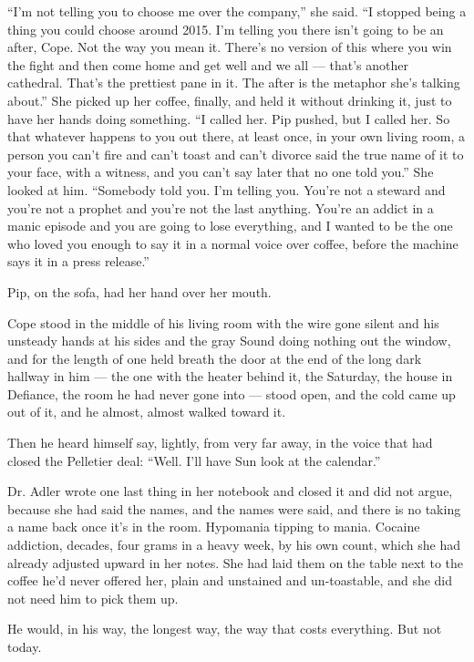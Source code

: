 \documentclass[11pt,openany]{book}
\begin{document}
``I'm not telling you to choose me over the company,'' she said. ``I stopped being a thing you could choose around 2015. I'm telling you there isn't going to be an after, Cope. Not the way you mean it. There's no version of this where you win the fight and then come home and get well and we all --- that's another cathedral. That's the prettiest pane in it. The after is the metaphor she's talking about.'' She picked up her coffee, finally, and held it without drinking it, just to have her hands doing something. ``I called her. Pip pushed, but I called her. So that whatever happens to you out there, at least once, in your own living room, a person you can't fire and can't toast and can't divorce said the true name of it to your face, with a witness, and you can't say later that no one told you.'' She looked at him. ``Somebody told you. I'm telling you. You're not a steward and you're not a prophet and you're not the last anything. You're an addict in a manic episode and you are going to lose everything, and I wanted to be the one who loved you enough to say it in a normal voice over coffee, before the machine says it in a press release.''

Pip, on the sofa, had her hand over her mouth.

Cope stood in the middle of his living room with the wire gone silent and his unsteady hands at his sides and the gray Sound doing nothing out the window, and for the length of one held breath the door at the end of the long dark hallway in him --- the one with the heater behind it, the Saturday, the house in Defiance, the room he had never gone into --- stood open, and the cold came up out of it, and he almost, almost walked toward it.

Then he heard himself say, lightly, from very far away, in the voice that had closed the Pelletier deal: ``Well. I'll have Sun look at the calendar.''

Dr. Adler wrote one last thing in her notebook and closed it and did not argue, because she had said the names, and the names were said, and there is no taking a name back once it's in the room. Hypomania tipping to mania. Cocaine addiction, decades, four grams in a heavy week, by his own count, which she had already adjusted upward in her notes. She had laid them on the table next to the coffee he'd never offered her, plain and unstained and un-toastable, and she did not need him to pick them up.

He would, in his way, the longest way, the way that costs everything. But not today.
\end{document}
